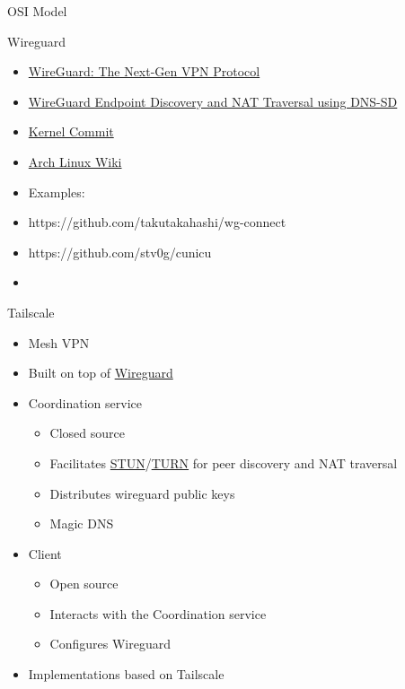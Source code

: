 \begin{frame}[fragile]{OSI Model}
\begin{block}{Wireguard}
\begin{itemize}
  \begin{itemize}
  \tightlist
  \item
    \href{https://blogs.keysight.com/blogs/tech/nwvs.entry.html/2022/09/22/wireguard_the_next-genvpnprotocol-OcEz.html}{WireGuard:
    The Next-Gen VPN Protocol}
  \item
    \href{https://www.jordanwhited.com/posts/wireguard-endpoint-discovery-nat-traversal/}{WireGuard
    Endpoint Discovery and NAT Traversal using DNS-SD}
  \item
    \href{https://git.kernel.org/pub/scm/linux/kernel/git/torvalds/linux.git/commit/?id=e7096c131e5161fa3b8e52a650d7719d2857adfd}{Kernel
    Commit}
  \item
    \href{https://wiki.archlinux.org/title/WireGuard}{Arch Linux Wiki}
  \item
    Examples:
  \item
    https://github.com/takutakahashi/wg-connect
  \item
    https://github.com/stv0g/cunicu
  \item
  \end{itemize}
\end{itemize}
\end{block}

\begin{block}{Tailscale}
\protect\hypertarget{tailscale}{}
\begin{itemize}
\tightlist
\item
  Mesh VPN
\item
  Built on top of \href{notes/02051-wireguard.md}{Wireguard}
\item
  Coordination service

  \begin{itemize}
  \tightlist
  \item
    Closed source
  \item
    Facilitates
    \href{notes/0202-nat\#Session\%20Traversal\%20Utilities\%20for\%20NAT\%20(STUN)}{STUN}/\href{notes/02021-internet-protocol.md\#test}{TURN}
    for peer discovery and NAT traversal
  \item
    Distributes wireguard public keys
  \item
    Magic DNS
  \end{itemize}
\item
  Client

  \begin{itemize}
  \tightlist
  \item
    Open source
  \item
    Interacts with the Coordination service
  \item
    Configures Wireguard
  \end{itemize}
\item
  Implementations based on Tailscale


\end{itemize}
\end{block}
\end{frame}
